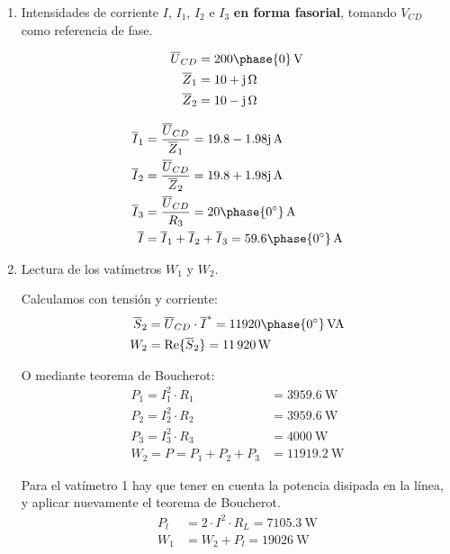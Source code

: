 \documentclass[12pt]{article}
\begin{document}
\begin{enumerate}
\item Intensidades de corriente $I$, $I_1$, $I_2$ e $I_3$ \textbf{en forma fasorial}, tomando $V_{CD}$ como referencia de fase.

  \begin{align*}
\overline{U}_{CD} &= \SI[parse-numbers=false]{200\phase{0}}{\volt}\\
%
\overline{Z}_1 &= \SI[parse-numbers=false]{10 + \mathrm{j}}{\ohm}\\
%
\overline{Z}_2 &= \SI[parse-numbers=false]{10 - \mathrm{j}}{\ohm}
\end{align*}

\begin{align*}
\overline{I}_1 &= \frac{\overline{U}_{CD}}{\overline{Z}_1} = \SI[parse-numbers=false]{19.8 - 1.98\mathrm{j}}{\ampere}\\
%
\overline{I}_2 &= \frac{\overline{U}_{CD}}{\overline{Z}_2} = \SI[parse-numbers=false]{19.8 + 1.98\mathrm{j}}{\ampere}\\
%
\overline{I}_3 &= \frac{\overline{U}_{CD}}{R_3} = \SI[parse-numbers=false]{20\phase{\ang{0}}}{\ampere}\\
%
\overline{I} &= \overline{I}_1 + \overline{I}_2 + \overline{I}_3 =  \SI[parse-numbers=false]{59.6\phase{\ang{0}}}{\ampere}\\
\end{align*}

\item Lectura de los vatímetros $W_1$ y $W_2$.

  Calculamos con tensión y corriente:
  \begin{align*}
\overline{S}_2 &= \overline{U}_{CD} \cdot \overline{I}^* = \SI[parse-numbers=false]{11920\phase{\ang{0}}}{VA}\\
%
W_2 &= \mathrm{Re}\{\overline{S}_2\} = \SI{11920}{\watt}
\end{align*}

O mediante teorema de Boucherot:
\begin{align*}
  P_1 = I_1^2 \cdot R_1 &= \SI{3959.6}{\watt}\\
  P_2 = I_2^2 \cdot R_2 &= \SI{3959.6}{\watt}\\
  P_3 = I_3^2 \cdot R_3 &= \SI{4000}{\watt}\\
  W_2 = P = P_1 + P_2 + P_3 &= \SI{11919.2}{\watt}
\end{align*}

Para el vatímetro 1 hay que tener en cuenta la potencia disipada en la línea, y aplicar nuevamente el teorema de Boucherot.
\begin{align*}
P_l &= 2 \cdot I^2 \cdot R_L = \SI{7105.3}{\watt}\\
W_1 &= W_2 + P_l = \SI{19026}{\watt}
\end{align*}

\end{enumerate}
\end{document}
